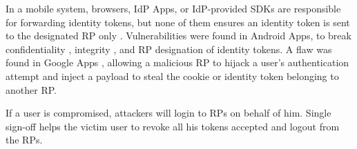 In a mobile system,
browsers, IdP Apps,
    or IdP-provided SDKs %
         are responsible for forwarding identity tokens, %
but none of them ensures an identity token is sent to the designated RP only \cite{ChenPCTKT14,WangZLLYLG15}.
Vulnerabilities were found in Android Apps,
    to break confidentiality \cite{ChenPCTKT14,WangZLLYLG15,YangLS17,ShiWL19}, integrity \cite{ChenPCTKT14,YangLS17}, and RP designation \cite{ChenPCTKT14,ShiWL19} of identity tokens.
A flaw was found in Google Apps \cite{ArmandoCCCPS13}, allowing a malicious RP to hijack a user's authentication attempt and inject a payload to steal the cookie or identity token belonging to another RP.

If a user is compromised,
    attackers will login to RPs on behalf of him.
Single sign-off \cite{GhasemisharifRC18} helps the victim user
 to revoke all his tokens accepted and logout from the RPs.



